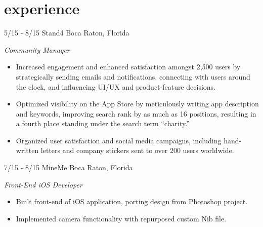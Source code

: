 \documentclass[print]{friggeri-cv}
\begin{document}
\vspace{-20pt} %

\section{experience}
\begin{entrylist}

\entry
{5/15 - 8/15}
{Stand4}
{Boca Raton, Florida}
{
\emph{Community Manager}
\begin{itemize}
	\item Increased engagement and enhanced satisfaction amongst 2,500 users by strategically sending emails and notifications, connecting with users around the clock, and influencing UI/UX and product-feature decisions. 
	\item Optimized visibility on the App Store by meticulously writing app description and keywords, improving search rank by as much as 16 positions, resulting in a fourth place standing under the search term ``charity.''
	\item Organized user satisfaction and social media campaigns, including hand-written letters and company stickers sent to over 200 users worldwide.
\end{itemize} 
}

\entry
{7/15 - 8/15}
{MineMe}
{Boca Raton, Florida}
{
\emph{Front-End iOS Developer}
\begin{itemize}
	\item Built front-end of iOS application, porting design from Photoshop project.
	\item Implemented camera functionality with repurposed custom Nib file.
\end{itemize}
}


\end{entrylist}
\end{document}

